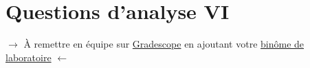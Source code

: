 \documentclass[canadien,12pt,oneside,letterpaper]{article}
\begin{document}



\section{Questions d'analyse VI} \label{sec:grade}
\vspace{-0.5cm}
\noindent$\rightarrow$ À remettre en équipe sur \href{https://www.gradescope.com/}{Gradescope} en ajoutant votre \href{https://help.gradescope.com/article/m5qz2xsnjy-student-add-group-members}{binôme de laboratoire} $\leftarrow$
\end{document}
